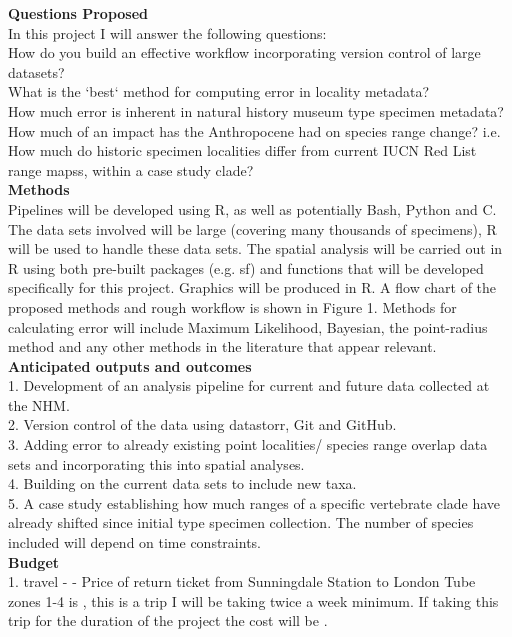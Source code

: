 \documentclass[11pt,onehalfspacing]{article}
\begin{document}
\textbf{Questions Proposed} \\ 
In this project I will answer the following questions: \\
How do you build an effective workflow incorporating version control of large datasets? \\
What is the `best` method for computing error in locality metadata? \\
How much  error is inherent in natural history museum type specimen metadata? \\
How much of an impact has the Anthropocene had on species range change? i.e. How much do historic specimen localities differ from current IUCN Red List range mapss, within a case study clade?\\

\textbf{Methods} \\ 
Pipelines will be developed using R, as well as potentially Bash, Python and C. 
The data sets involved will be large  (covering many thousands of specimens), R will be used to handle these data sets. The spatial analysis will be carried out in R using both pre-built packages (e.g. sf) and functions that will be developed specifically for this project. Graphics will be produced in R. A flow chart of the proposed methods and rough workflow is shown in Figure 1.
Methods for calculating error will include Maximum Likelihood, Bayesian, the point-radius method \cite{Wieczorek2004} and any other methods in the literature that appear relevant. \\


\textbf{Anticipated outputs and outcomes} \\
1. Development of an analysis pipeline for current and future data collected at the NHM. \\
2. Version control of the data using datastorr, Git and GitHub. \\
3. Adding error to already existing point localities/ species range overlap data sets and incorporating this into spatial analyses. \\
4. Building on the current data sets to include new taxa. \\
5. A case study establishing how much ranges of a specific vertebrate clade have already shifted since initial type specimen collection. The number of species included will depend on time constraints. \\


\textbf{Budget} \\
1. travel -   - Price of return ticket from Sunningdale Station to London Tube zones 1-4 is , this is a trip I will be taking twice a week minimum. If taking this trip for the duration of the project the cost will be .
\end{document}
